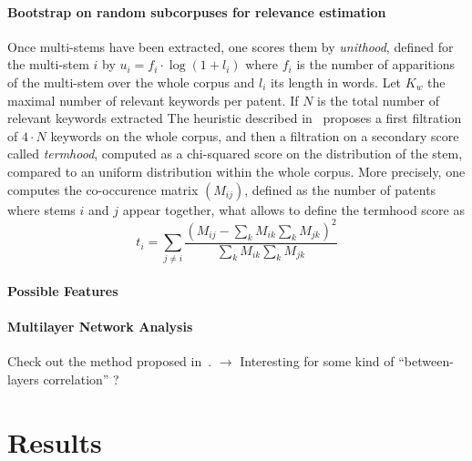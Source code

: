 \paragraph{Bootstrap on random subcorpuses for relevance estimation}

Once multi-stems have been extracted, one scores them by \emph{unithood}, defined for the multi-stem $i$ by $u_i = f_i\cdot \log{(1 + l_i)}$ where $f_i$ is the number of apparitions of the multi-stem over the whole corpus and $l_i$ its length in words. Let $K_w$ the maximal number of relevant keywords per patent. If $N$ is the total number of relevant keywords extracted 
The heuristic described in~\cite{chavalarias2013phylomemetic} proposes a first filtration of $4\cdot N$ keywords on the whole corpus, and then a filtration on a secondary score called \emph{termhood}, computed as a chi-squared score on the distribution of the stem, compared to an uniform distribution within the whole corpus. More precisely, one computes the co-occurence matrix $(M_{ij})$, defined as the number of patents where stems $i$ and $j$ appear together, what allows to define the termhood score as
\[
t_i = \sum_{j\neq i}\frac{\left( M_{ij} - \sum_{k}M_{ik} \sum_{k} M_{jk}\right)^2}{\sum_{k}M_{ik} \sum_{k} M_{jk}}
\]




\paragraph{Possible Features}






\paragraph{Multilayer Network Analysis}
Check out the method proposed in~\cite{iacovacci2015mesoscopic}. $\rightarrow$ Interesting for some kind of ``between-layers correlation'' ?








\section{Results}

















